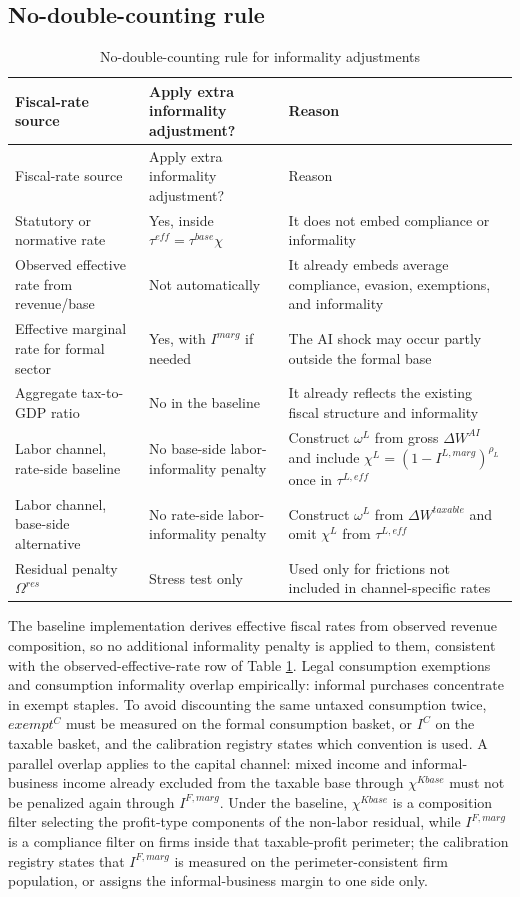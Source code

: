 \documentclass[11pt,a4paper]{article}
\begin{document}
\subsection{No-double-counting rule}

\begin{longtable}{p{}p{}p{}}
\caption{No-double-counting rule for informality adjustments}\label{tab:no_double_counting_informality}\\
\toprule
Fiscal-rate source & Apply extra informality adjustment? & Reason \\
\midrule
\endfirsthead
\toprule
Fiscal-rate source & Apply extra informality adjustment? & Reason \\
\midrule
\endhead
Statutory or normative rate & Yes, inside $\tau^{eff}=\tau^{base}\chi$ & It does not embed compliance or informality \\
Observed effective rate from revenue/base & Not automatically & It already embeds average compliance, evasion, exemptions, and informality \\
Effective marginal rate for formal sector & Yes, with $I^{marg}$ if needed & The AI shock may occur partly outside the formal base \\
Aggregate tax-to-GDP ratio & No in the baseline & It already reflects the existing fiscal structure and informality \\
Labor channel, rate-side baseline & No base-side labor-informality penalty & Construct $\omega^L$ from gross $\Delta W^{AI}$ and include $\chi^L=(1-I^{L,marg})^{\rho_L}$ once in $\tau^{L,eff}$ \\
Labor channel, base-side alternative & No rate-side labor-informality penalty & Construct $\omega^L$ from $\Delta W^{taxable}$ and omit $\chi^L$ from $\tau^{L,eff}$ \\
Residual penalty $\Omega^{res}$ & Stress test only & Used only for frictions not included in channel-specific rates \\
\bottomrule
\end{longtable}
The baseline implementation derives effective fiscal rates from observed revenue composition, so no additional informality penalty is applied to them, consistent with the observed-effective-rate row of Table \ref{tab:no_double_counting_informality}.
Legal consumption exemptions and consumption informality overlap empirically: informal purchases concentrate in exempt staples. To avoid discounting the same untaxed consumption twice, $exempt^C$ must be measured on the formal consumption basket, or $I^C$ on the taxable basket, and the calibration registry states which convention is used. A parallel overlap applies to the capital channel: mixed income and informal-business income already excluded from the taxable base through $\chi^{Kbase}$ must not be penalized again through $I^{F,marg}$. Under the baseline, $\chi^{Kbase}$ is a composition filter selecting the profit-type components of the non-labor residual, while $I^{F,marg}$ is a compliance filter on firms inside that taxable-profit perimeter; the calibration registry states that $I^{F,marg}$ is measured on the perimeter-consistent firm population, or assigns the informal-business margin to one side only.
\end{document}
